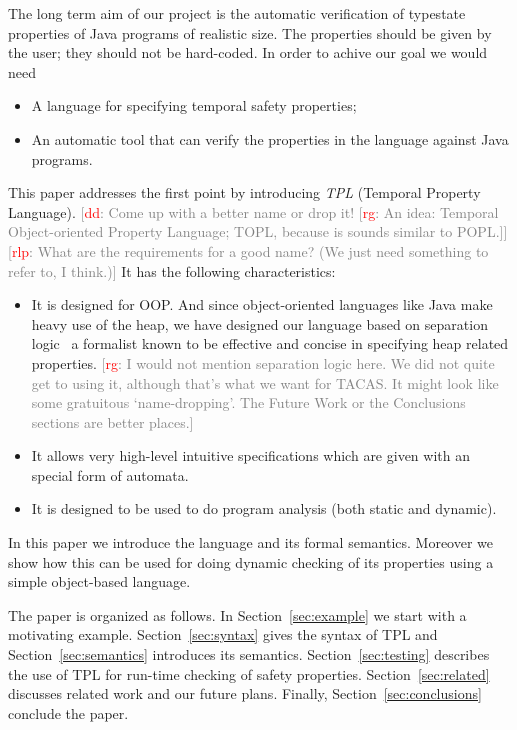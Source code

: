 \documentclass[preprint]{sigplanconf} %
\newcommand{\note}[2]{\textcolor{gray}{[\textcolor{red}{#1}: #2]}}
\newcommand{\rg}[1]{\note{rg}{#1}}
\newcommand{\rlp}[1]{\note{rlp}{#1}}
\newcommand{\dd}[1]{\note{dd}{#1}}
\newcommand{\dinocomment}[1]{\dd{#1}}
\theoremstyle{definition}
\begin{document}
The long term aim of our project is the automatic verification of typestate properties of Java programs of realistic size.  
The properties should be given by the user; they should not be hard-coded.
In order to achive our goal we would need
\begin{itemize}
\item A language for specifying temporal safety properties;
\item An automatic tool that can verify the properties in the language
  against Java programs.
\end{itemize}
This paper addresses the first point by introducing {\em TPL} (Temporal Property Language). 
\dinocomment{Come up with a better name or drop it!
\rg{An idea: Temporal Object-oriented Property Language; TOPL, because is sounds similar to POPL.}}
\rlp{What are the requirements for a good name? (We just need
  something to refer to, I think.)}
It has the following characteristics:
\begin{itemize}
\item It is designed for OOP. 
And since object-oriented languages like Java make heavy use of the heap, we have designed our language based on separation logic~\cite{reynolds2002} a formalist known to be effective and concise in specifying heap related properties.
\rg{I would not mention separation logic here.
We did not quite get to using it, although that's what we want for TACAS\null.
It might look like some gratuitous `name-dropping'.
The Future Work or the Conclusions sections are better places.}
\item It allows very high-level intuitive specifications which are given with an special form of automata.
\item It is designed to be used to do program analysis (both static and dynamic).
\end{itemize}  
In this paper we introduce the language and its formal semantics. 
Moreover we show how this can be used for doing dynamic checking of its properties using a simple object-based language.


The paper is organized as follows. In Section~\ref{sec:example} we start with a motivating example. 
Section~\ref{sec:syntax} gives the syntax of TPL and Section~\ref{sec:semantics} introduces its semantics. 
Section~\ref{sec:testing} describes the use of TPL for run-time checking of safety properties. 
Section~\ref{sec:related} discusses related work and our future plans. 
Finally, Section~\ref{sec:conclusions} conclude the paper.
\end{document}
